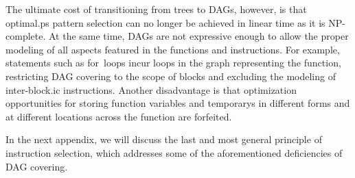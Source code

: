 The ultimate cost of transitioning from \glspl{tree} to \glspl{DAG}, however, is
that \gls{optimal.ps} \gls{pattern selection} can no longer be achieved in
linear time as it is NP-complete.
%
At the same time, \glspl{DAG} are not expressive enough to allow the proper
modeling of all aspects featured in the \glspl{function} and
\glspl{instruction}.
%
For example, statements such as \mbox{for loops} incur \glspl{loop} in the
\gls{graph} representing the \gls{function}, restricting \gls{DAG covering} to
the scope of \glspl{block} and excluding the modeling of \gls{inter-block.ic}
\glspl{instruction}.
%
Another disadvantage is that optimization opportunities for storing
\gls{function} variables and \glspl{temporary} in different forms and at
different locations across the \gls{function} are forfeited.

In the next appendix, we will discuss the last and most general \gls{principle}
of \gls{instruction selection}, which addresses some of the aforementioned
deficiencies of \gls{DAG covering}.
